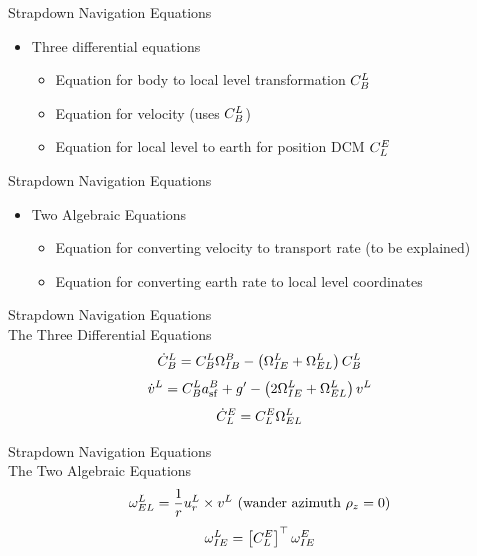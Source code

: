 \begin{frame}
Strapdown Navigation Equations
 \begin{itemize}
 \item Three differential equations
 \begin{itemize}
   \item Equation for body to local level transformation $C_{B}^{L}$
   \item Equation for velocity (uses $C_{B}^{L}$)
   \item Equation for local level to earth for position DCM $C_{L}^{E}$
 \end{itemize}
\end{itemize}
\end{frame}
\begin{frame}
Strapdown Navigation Equations
 \begin{itemize}
 \item Two Algebraic Equations
 \begin{itemize}
   \item Equation for converting velocity to transport rate (to be explained)
   \item Equation for converting earth rate to local level
   coordinates
 \end{itemize}
\end{itemize}
\end{frame}
\begin{frame}
Strapdown Navigation Equations\\
The Three Differential Equations\\
\begin{equation}\label{cbleq}
  \dot{C}_B^L=C_{B}^{L}\Omega_{IB}^B - \left( \Omega_{IE}^L+\Omega_{EL}^L\right)C_{B}^{L}
\end{equation}
\begin{equation}\label{strapveleq}
  \dot{v}^L=C_{B}^{L}a_{\text{sf}}^B+ g'-\left(2\Omega_{IE}^L + \Omega_{EL}^L \right)v^L
\end{equation}
\begin{equation}\label{cleeq}
  \dot{C}_L^E=C_L^E\Omega_{EL}^L
\end{equation}
\end{frame}
\begin{frame}
Strapdown Navigation Equations\\
The Two Algebraic Equations\\
\begin{equation}\label{trateeq}
  \omega_{EL}^L=\dfrac{1}{r}u_r^L\times v^L \text{ (wander azimuth $\rho_z=0$)}
\end{equation}
\begin{equation}\label{erateeq}
  \omega_{IE}^L=\left[C_{L}^{E} \right]^\top \omega_{IE}^E
\end{equation}
\end{frame}
